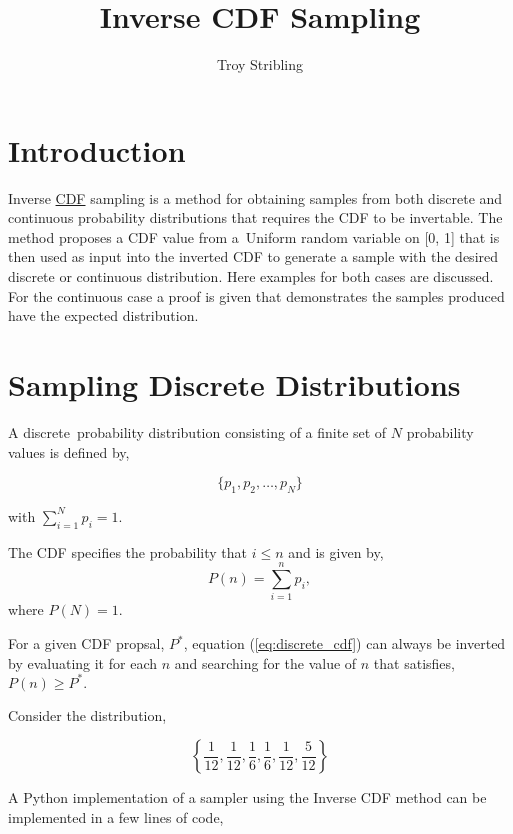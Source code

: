 \documentclass[12pt]{article}
\title{Inverse CDF Sampling}
\author{Troy Stribling}
\begin{document}
\iftex
\maketitle
\fi

\iftex
\section{Introduction}
\fi

Inverse \href{https://en.wikipedia.org/wiki/Cumulative_distribution_function}{CDF} sampling is a method for obtaining samples from both discrete and continuous probability distributions
that requires the CDF to be invertable.
The method proposes a CDF value from a Uniform random variable on [0, 1] that is then used as input
into the inverted CDF to generate a sample
with the desired discrete or continuous distribution. Here examples for both cases are discussed.
For the continuous case a proof is given that demonstrates the samples produced have the expected distribution.

\section{Sampling Discrete Distributions}

A discrete probability distribution consisting of a finite set of $N$ probability values is defined by,

\begin{equation}
\label{eq:discrete_distribution}
\{p_1, p_2,\ldots,p_N\}
\end{equation}

with $\sum_{i=1}^N{p_i} = 1.$

The CDF specifies the probability that $i \leq n$ and is given by,
\begin{equation}
\label{eq:discrete_cdf}
P(n)=\sum_{i=1}^n{p_i},
\end{equation}
where $P(N)=1.$

For a given CDF propsal, $P^*$, equation (\ref{eq:discrete_cdf}) can always be inverted by evaluating it for each $n$ and
searching for the value of $n$ that satisfies, $P(n) \geq P^*.$

Consider the distribution,

\begin{equation} \label{eq:discrete}
\left \{\frac{1}{12}, \frac{1}{12}, \frac{1}{6}, \frac{1}{6}, \frac{1}{12}, \frac{5}{12} \right\}
\end{equation}

A Python implementation of a sampler using the Inverse CDF method can be implemented in a few lines of code,
\end{document}
